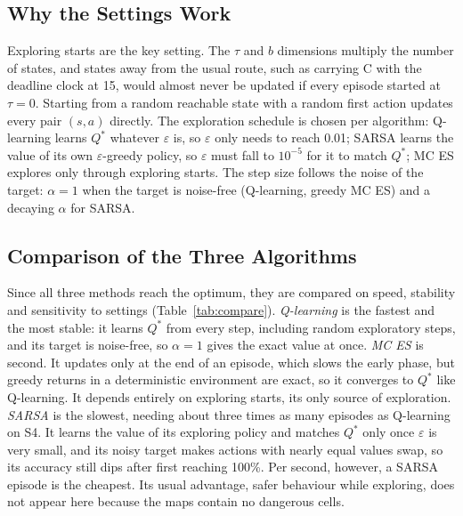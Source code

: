 \documentclass[conference]{IEEEtran}
\newcommand{\Qs}{Q^{*}}
\newcommand{\eps}{\varepsilon}
\begin{document}
\subsection{Why the Settings Work}\label{sec:settings}
Exploring starts are the key setting. The $\tau$ and $b$ dimensions multiply the number of states, and states away from the usual route, such as carrying C with the deadline clock at 15, would almost never be updated if every episode started at $\tau=0$. Starting from a random reachable state with a random first action updates every pair $(s,a)$ directly. The exploration schedule is chosen per algorithm: Q-learning learns $\Qs$ whatever $\eps$ is, so $\eps$ only needs to reach 0.01; SARSA learns the value of its own $\eps$-greedy policy, so $\eps$ must fall to $10^{-5}$ for it to match $\Qs$; MC ES explores only through exploring starts. The step size follows the noise of the target: $\alpha=1$ when the target is noise-free (Q-learning, greedy MC ES) and a decaying $\alpha$ for SARSA.

\subsection{Comparison of the Three Algorithms}
Since all three methods reach the optimum, they are compared on speed, stability and sensitivity to settings (Table~\ref{tab:compare}). \emph{Q-learning} is the fastest and the most stable: it learns $\Qs$ from every step, including random exploratory steps, and its target is noise-free, so $\alpha=1$ gives the exact value at once. \emph{MC ES} is second. It updates only at the end of an episode, which slows the early phase, but greedy returns in a deterministic environment are exact, so it converges to $\Qs$ like Q-learning. It depends entirely on exploring starts, its only source of exploration. \emph{SARSA} is the slowest, needing about three times as many episodes as Q-learning on S4. It learns the value of its exploring policy and matches $\Qs$ only once $\eps$ is very small, and its noisy target makes actions with nearly equal values swap, so its accuracy still dips after first reaching 100\%. Per second, however, a SARSA episode is the cheapest. Its usual advantage, safer behaviour while exploring, does not appear here because the maps contain no dangerous cells.
\end{document}
